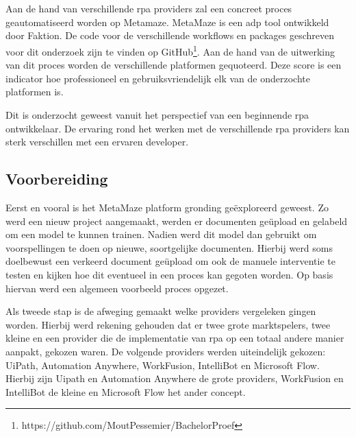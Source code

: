 
\chapter{}
\label{ch:methodologie}

Aan de hand van verschillende \acrshort{rpa} providers zal een concreet proces geautomatiseerd worden op Metamaze. MetaMaze is een \acrfull{adp} tool ontwikkeld door Faktion. De code voor de verschillende workflows en packages geschreven voor dit onderzoek zijn te vinden op GitHub\footnote{https://github.com/MoutPessemier/BachelorProef}. Aan de hand van de uitwerking van dit proces worden de verschillende platformen gequoteerd. Deze score is een indicator hoe professioneel en gebruiksvriendelijk elk van de onderzochte platformen is.

Dit is onderzocht geweest vanuit het perspectief van een beginnende \acrshort{rpa} ontwikkelaar. De ervaring rond het werken met de verschillende \acrshort{rpa} providers kan sterk verschillen met een ervaren developer.


\section{Voorbereiding}
Eerst en vooral is het MetaMaze platform gronding geëxploreerd geweest. Zo werd een nieuw project aangemaakt, werden er documenten geüpload en gelabeld om een model te kunnen trainen. Nadien werd dit model dan gebruikt om voorspellingen te doen op nieuwe, soortgelijke documenten. Hierbij werd soms doelbewust een verkeerd document geüpload om ook de manuele interventie te testen en kijken hoe dit eventueel in een proces kan gegoten worden. Op basis hiervan werd een algemeen voorbeeld proces opgezet.

Als tweede stap is de afweging gemaakt welke providers vergeleken gingen worden. Hierbij werd rekening gehouden dat er twee grote marktspelers, twee kleine en een provider die de implementatie van \acrshort{rpa} op een totaal andere manier aanpakt, gekozen waren. De volgende providers werden uiteindelijk gekozen: UiPath, Automation Anywhere, WorkFusion, IntelliBot en Microsoft Flow. Hierbij zijn Uipath en Automation Anywhere de grote providers, WorkFusion en IntelliBot de kleine en Microsoft Flow het ander concept.


